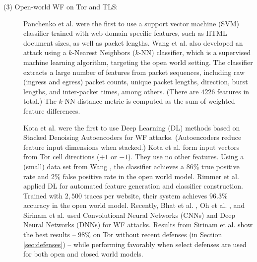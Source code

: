 \documentclass[runningheads]{llncs}
\begin{document}
\begin{description}

\item [(3) Open-world WF on Tor and TLS:] Panchenko et al. \cite{panchenko2011website}
were the first to use a support vector machine (SVM) classifier trained with web domain-specific
features, such as HTML document sizes, as well as packet lengths.
Wang et al. \cite{wang2014effective} also developed an attack using a $k$-Nearest Neighbors ($k$-NN) classifier,
which is a supervised machine learning algorithm, targeting the open world setting. The classifier
extracts a large number of features from packet sequences, including raw (ingress and egress)
packet counts, unique packet lengths, direction, burst lengths, and inter-packet times, among others.
(There are $4226$ features in total.) The $k$-NN distance metric is computed as the sum of weighted
feature differences.


Kota et al. \cite{abe2016fingerprinting} were the first to use Deep Learning (DL) methods based on Stacked
Denoising Autoencoders for WF attacks. (Autoencoders reduce feature input dimensions when stacked.)
Kota et al. form input vectors from Tor cell directions ($+1$ or $-1$). They use no other features.
Using a (small) data set from Wang \cite{wang2016website}, the classifier achieves a $86\%$ true positive
rate and $2\%$ false positive rate in the open world model. Rimmer et al. \cite{rimmer2018automated}
applied DL for automated feature generation and classifier construction. Trained with $2,500$ traces per
website, their system achieves $96.3\%$ accuracy in the open world model.
Recently, Bhat et al. \cite{bhat2018var}, Oh et al. \cite{oh2017pfp}, and Sirinam et al. \cite{sirinam2018deep}
used Convolutional Neural Networks (CNNs) and Deep Neural Networks (DNNs) for WF attacks. Results from
Sirinam et al. show the best results -- $98\%$ on Tor without recent defenses (in Section \ref{sec:defenses}) --
while performing favorably when select defenses are used for both open and closed world models.


\end{description}
\end{document}
